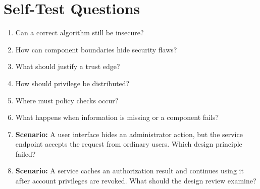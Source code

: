 \documentclass[11pt,letterpaper]{article}
\begin{document}
\section{Self-Test Questions}
\begin{enumerate}
\item Can a correct algorithm still be insecure?
\item How can component boundaries hide security flaws?
\item What should justify a trust edge?
\item How should privilege be distributed?
\item Where must policy checks occur?
\item What happens when information is missing or a component fails?
\item \textbf{Scenario:} A user interface hides an administrator action, but the service endpoint accepts the request from ordinary users. Which design principle failed?
\item \textbf{Scenario:} A service caches an authorization result and continues using it after account privileges are revoked. What should the design review examine?
\end{enumerate}
\clearpage
\end{document}
